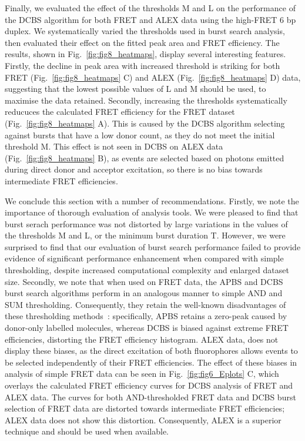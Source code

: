 \documentclass[10pt]{article}
\begin{document}
Finally, we evaluated the effect of the thresholds M and L on the performance of the DCBS algorithm for both FRET and ALEX data using the high-FRET 6 bp duplex. We systematically varied the thresholds used in burst search analysis, then evaluated their effect on the fitted peak area and FRET efficiency. The results, shown in Fig.~\ref{fig:fig8_heatmaps}, display several interesting features. Firstly, the decline in peak area with increased threshold is striking for both FRET (Fig.~\ref{fig:fig8_heatmaps} C) and ALEX (Fig.~\ref{fig:fig8_heatmaps} D) data, suggesting that the lowest possible values of L and M should be used, to maximise the data retained. Secondly, increasing the thresholds systematically reducuces the calculated FRET efficiency for the FRET dataset (Fig.~\ref{fig:fig8_heatmaps} A). This is caused by the DCBS algorithm selecting against bursts that have a low donor count, as they do not meet the initial threshold M. This effect is not seen in DCBS on ALEX data (Fig.~\ref{fig:fig8_heatmaps} B), as events are selected based on photons emitted during direct donor and acceptor excitation, so there is no bias towards intermediate FRET efficiencies.

We conclude this section with a number of recommendations. Firstly, we note the importance of thorough evaluation of analysis tools. We were pleased to find that burst serach performance was not distorted by large variations in the values of the thresholds M and L, or the minimum burst duration T. However, we were surprised to find that our evaluation of burst search performance failed to provide evidence of significant performance enhancement when compared with simple thresholding, despite increased computational complexity and enlarged dataset size. Secondly, we note that when used on FRET data, the APBS and DCBS burst search algorithms perform in an analogous manner to simple AND and SUM thresholding. Consequently, they retain the well-known disadvantages of these thresholding methods~\cite{murphy14}: specifically, APBS retains a zero-peak caused by donor-only labelled molecules, whereas DCBS is biased against extreme FRET efficiencies, distorting the FRET efficiency histogram. ALEX data, does not display these biases, as the direct excitation of both fluorophores allows events to be selected independently of their FRET efficiencies. The effect of these biases in analysis of simple FRET data can be seen in Fig.~\ref{fig:fig6_Eplots} C, which overlays the calculated FRET efficiency curves for DCBS analysis of FRET and ALEX data. The curves for both AND-thresholded FRET data and DCBS burst selection of FRET data are distorted towards intermediate FRET efficiencies; ALEX data does not show this distortion. Consequently, ALEX is a superior technique and should be used when available.
\end{document}
